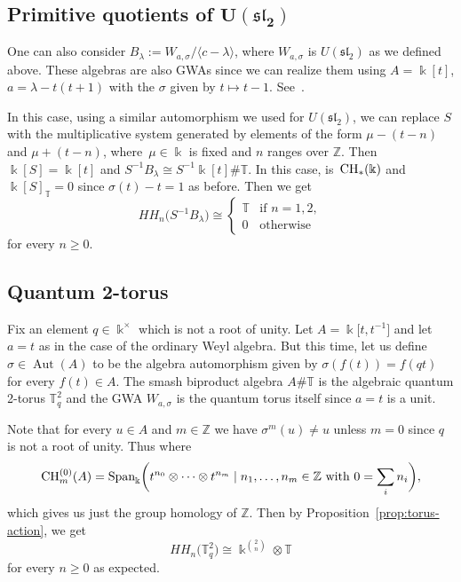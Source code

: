 \documentclass[10pt,a4paper]{amsart}
\newcommand{\G}[1]{\mathfrak{#1}}
\newcommand{\B}[1]{\mathbb{#1}}
\newcommand{\CH}{{\rm CH}}
\renewcommand{\geq}{\geqslant}
\numberwithin{equation}{section}
\begin{document}
\subsection[Primitive quotients of U(G sl\_2)]{Primitive quotients of $\boldsymbol{U(\G{sl}_2)}$}

One can also consider $B_\lambda := W_{a,\sigma}/\langle c-\lambda\rangle$, where
$W_{a,\sigma}$ is $U(\G{sl}_2)$ as we defined above. These algebras are also GWAs since we
can realize them using $A=\Bbbk[t]$, $a=\lambda-t(t+1)$ with the $\sigma$ given by
$t\mapsto t-1$. See~\cite[Section 3]{BavulaJordan:IsoProblem}.

In this case, using a similar automorphism we used for $U(\G{sl}_2)$, we can replace $S$ with the
multiplicative system generated by elements of the form $\mu-(t-n)$ and $\mu+(t-n)$, where~${\mu\in\Bbbk}$ is fixed and $n$ ranges over $\B{Z}$. Then $\Bbbk[S] = \Bbbk[t]$ and
$S^{-1}B_\lambda\cong S^{-1}\Bbbk[t]\# \B{T}$. In this case, \smash{$\CH_*\bigl(S^{-1}\Bbbk[t]\bigr)^{\B{T}}$} is~$\CH_*(\Bbbk)$ and $\Bbbk[S]_{\B{T}}=0$ since $\sigma(t)-t=1$ as before. Then we get
\[ HH_n\bigl(S^{-1}B_\lambda\bigr)\cong
 \begin{cases}
 \B{T} & \text{if } n=1,2,\\
 0 & \text{otherwise}
 \end{cases}
\] for every $n\geq 0$.

\subsection{Quantum 2-torus}\label{subsect:quantumTorus}

Fix an element $q\in\Bbbk^\times$ which is not a root of unity. Let $A =\Bbbk\big[t,t^{-1}\big]$ and
let $a=t$ as in the case of the ordinary Weyl algebra. But this time, let us define
$\sigma\in \operatorname{Aut}(A)$ to be the algebra automorphism given by $\sigma(f(t)) = f(qt)$ for every
$f(t)\in A$. The smash biproduct algebra $A\# \B{T}$ is the algebraic quantum 2-torus
$\B{T}^2_q$ and the GWA $W_{a,\sigma}$ is the quantum torus itself since $a=t$ is a unit.

Note that for every $u\in A$ and $m\in\B{Z}$ we have $\sigma^m(u)\neq u$ unless $m=0$
since $q$ is not a root of unity. Thus \smash{$\CH_*(A)_\B{T} = \CH_*(A)^\B{T} = \CH^{(0)}_*(A)$}
where
\[%
 \CH^{(0)}_m(A)
 = \operatorname{Span}_{\Bbbk}\biggl(t^{n_0}\otimes\cdots\otimes t^{n_m}\mid n_1,\ldots,n_m\in\B{Z}
\text{ with } 0 = \sum_i n_i \biggr),
\]
which gives us just the group homology of $\B{Z}$. Then by
Proposition~\ref{prop:torus-action}, we get
\[ HH_n\bigl(\B{T}^2_q\bigr) \cong \Bbbk^{\binom{2}{n}}\otimes \B{T}
\] for every $n\geq 0$ as expected.
\end{document}
